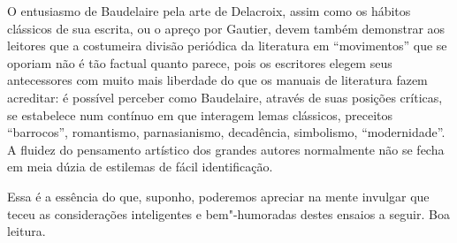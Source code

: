 O entusiasmo de Baudelaire pela arte de Delacroix, assim como os hábitos
clássicos de sua escrita, ou o apreço por Gautier, devem também
demonstrar aos leitores que a costumeira divisão periódica da
literatura em “movimentos” que se oporiam não é tão factual quanto
parece, pois os escritores elegem seus antecessores com muito mais
liberdade do que os manuais de literatura fazem acreditar: é possível
perceber como Baudelaire, através de suas posições críticas, se
estabelece num contínuo em que interagem lemas clássicos, preceitos
“barrocos”, romantismo, parnasianismo, decadência, simbolismo,
“modernidade”. A fluidez do pensamento artístico dos grandes autores
normalmente não se fecha em meia dúzia de estilemas de fácil
identificação.

Essa é a essência do que, suponho, poderemos apreciar na mente invulgar
que teceu as considerações inteligentes e bem"-humoradas destes ensaios
a seguir. Boa leitura.
